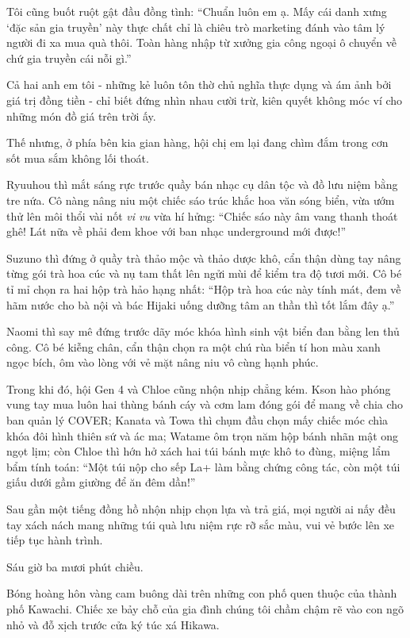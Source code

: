 \documentclass[../main.tex]{subfiles}
\begin{document}
Tôi cũng buốt ruột gật đầu đồng tình: ``Chuẩn luôn em ạ. Mấy cái danh xưng `đặc sản gia truyền' này thực chất chỉ là chiêu trò marketing đánh vào tâm lý người đi xa mua quà thôi. Toàn hàng nhập từ xưởng gia công ngoại ô chuyển về chứ gia truyền cái nỗi gì.''

Cả hai anh em tôi - những kẻ luôn tôn thờ chủ nghĩa thực dụng và ám ảnh bởi giá trị đồng tiền - chỉ biết đứng nhìn nhau cười trừ, kiên quyết không móc ví cho những món đồ giá trên trời ấy.

Thế nhưng, ở phía bên kia gian hàng, hội chị em lại đang chìm đắm trong cơn sốt mua sắm không lối thoát.

Ryuuhou thì mắt sáng rực trước quầy bán nhạc cụ dân tộc và đồ lưu niệm bằng tre nứa. Cô nàng nâng niu một chiếc sáo trúc khắc hoa văn sóng biển, vừa ướm thử lên môi thổi vài nốt \textit{vi vu} vừa hí hửng: ``Chiếc sáo này âm vang thanh thoát ghê! Lát nữa về phải đem khoe với ban nhạc underground mới được!''

Suzuno thì đứng ở quầy trà thảo mộc và thảo dược khô, cẩn thận dùng tay nâng từng gói trà hoa cúc và nụ tam thất lên ngửi mùi để kiểm tra độ tươi mới. Cô bé tỉ mỉ chọn ra hai hộp trà hảo hạng nhất: ``Hộp trà hoa cúc này tính mát, đem về hãm nước cho bà nội và bác Hijaki uống dưỡng tâm an thần thì tốt lắm đây ạ.''

Naomi thì say mê đứng trước dãy móc khóa hình sinh vật biển đan bằng len thủ công. Cô bé kiễng chân, cẩn thận chọn ra một chú rùa biển tí hon màu xanh ngọc bích, ôm vào lòng với vẻ mặt nâng niu vô cùng hạnh phúc.

Trong khi đó, hội Gen 4 và Chloe cũng nhộn nhịp chẳng kém. Kson hào phóng vung tay mua luôn hai thùng bánh cáy và cơm lam đóng gói để mang về chia cho ban quản lý COVER; Kanata và Towa thì chụm đầu chọn mấy chiếc móc chìa khóa đôi hình thiên sứ và ác ma; Watame ôm trọn năm hộp bánh nhãn mật ong ngọt lịm; còn Chloe thì hớn hở xách hai túi bánh mực khô to đùng, miệng lẩm bẩm tính toán: ``Một túi nộp cho sếp La+ làm bằng chứng công tác, còn một túi giấu dưới gầm giường để ăn đêm dần!''

Sau gần một tiếng đồng hồ nhộn nhịp chọn lựa và trả giá, mọi người ai nấy đều tay xách nách mang những túi quà lưu niệm rực rỡ sắc màu, vui vẻ bước lên xe tiếp tục hành trình.

\ct

Sáu giờ ba mươi phút chiều.

Bóng hoàng hôn vàng cam buông dài trên những con phố quen thuộc của thành phố Kawachi. Chiếc xe bảy chỗ của gia đình chúng tôi chầm chậm rẽ vào con ngõ nhỏ và đỗ xịch trước cửa ký túc xá Hikawa.
\end{document}
